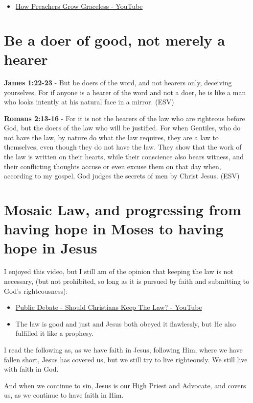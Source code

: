 \documentclass[11pt]{article}
\begin{document}
\begin{itemize}
\item \href{https://www.youtube.com/watch?v=alOI2zxIPgc}{How Preachers Grow Graceless - YouTube}
\end{itemize}

\section{Be a doer of good, not merely a hearer}
\label{sec:org9d536c0}
\textbf{James 1:22-23} -  But be doers of the word, and not hearers only, deceiving yourselves. For if anyone is a hearer of the word and not a doer, he is like a man who looks intently at his natural face in a mirror. (ESV)

\textbf{Romans 2:13-16} - For it is not the hearers of the law who are righteous before God, but the doers of the law who will be justified.  For when Gentiles, who do not have the law, by nature do what the law requires, they are a law to themselves, even though they do not have the law.  They show that the work of the law is written on their hearts, while their conscience also bears witness, and their conflicting thoughts accuse or even excuse them on that day when, according to my gospel, God judges the secrets of men by Christ Jesus. (ESV)

\section{Mosaic Law, and progressing from having hope in Moses to having hope in Jesus}
\label{sec:orgf19d2ed}
I enjoyed this video, but I still am of the opinion that keeping the law is not necessary, (but not prohibited, so long as it is pursued by faith and submitting to God's righteousness):
\begin{itemize}
\item \href{https://www.youtube.com/watch?v=CNHKqhwu6Bo}{Public Debate - Should Christians Keep The Law? - YouTube}
\item The law is good and just and Jesus both obeyed it flawlessly, but He also fulfilled it like a prophesy.
\end{itemize}

I read the following as, as we have faith in Jesus, following Him, where we have fallen short, Jesus has covered us, but we still try to live righteously. We still live with faith in God.

And when we continue to sin, Jesus is our High Priest and Advocate, and covers us, as we continue to have faith in Him.
\end{document}

